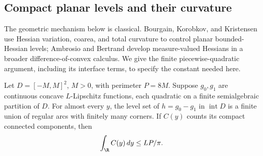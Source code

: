 \subsection{Compact planar levels and their curvature}
The geometric mechanism below is classical. Bourgain, Korobkov, and
Kristensen \cite[Theorem~6.1, Corollary~6.2, and their proof]{BourgainLevels}
use Hessian variation, coarea, and total curvature to control planar
bounded-Hessian levels; Ambrosio and Bertrand \cite[Section~5.1]{AmbrosioDC}
develop measure-valued Hessians in a broader difference-of-convex calculus.
We give the finite piecewise-quadratic argument, including its interface
terms, to specify the constant needed here.

\begin{lemma}\label{lem:loops}
Let $D=[-M,M]^2$, $M>0$, with perimeter $P=8M$. Suppose $g_0,g_1$
are continuous concave $L$-Lipschitz functions, each quadratic on a finite
semialgebraic partition of $D$. For almost every $y$, the level set of
$h=g_0-g_1$ in $\operatorname{int}D$ is a finite union of regular arcs
with finitely many corners. If $C(y)$ counts its compact connected
components, then
\begin{equation}\label{eq:loopintegral}
 \int_\R C(y)\,dy\le LP/\pi.
\end{equation}
\end{lemma}
